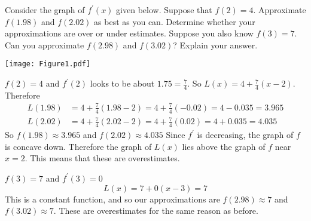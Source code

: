 \documentclass[handout,nooutcomes]{ximera}
\begin{document}
\begin{problem}
Consider the graph of $f^\prime (x)$ given below.  Suppose that $f(2) = 4$.  Approximate 
$f(1.98)$ and $f(2.02)$ as best as you can.  Determine whether your approximations are over or under estimates.  
Suppose you also know $f(3) = 7$.  
Can you approximate $f(2.98)$ and $f(3.02)$?  
Explain your answer.

	\begin{image}
	\texttt{[image: Figure1.pdf]}
	\end{image}
	
		\begin{freeResponse}
		$f(2) = 4$ and $f^\prime (2)$ looks to be about $1.75 = \frac{7}{4}$.  So $L(x) = 4 + \frac{7}{4} (x-2)$.  Therefore
			\begin{align*}
			L(1.98) &= 4 + \frac{7}{4} (1.98-2) = 4 + \frac{7}{4} (-0.02) = 4-0.035 = 3.965 \\
			L(2.02) &= 4 + \frac{7}{4} (2.02-2) = 4 + \frac{7}{4} (0.02) = 4+0.035 = 4.035
			\end{align*}
		So $f(1.98)\approx 3.965$ and $f(2.02)\approx 4.035$ 
Since $f^\prime$ is decreasing, the graph of $f$ is concave down.  Therefore the graph of $L(x)$ lies above the graph of $f$ near $x=2$.  This means that these are overestimates.

		$f(3)=7$ and $f^\prime (3)=0$ 
		$$ L(x) =7+0(x-3) = 7$$
		This is a constant function, and so our approximations are $f(2.98)\approx 7$ and $f(3.02)\approx 7$. These are overestimates for the same reason as before.
		\end{freeResponse}
		
		
		

\end{problem}
	
	
	
	
	
	
	
	
			
			
\end{document}
